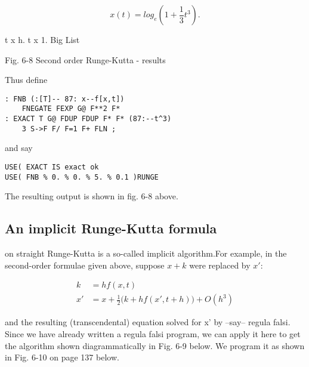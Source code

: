 \begin{equation}
x(t) =log_e(1 +\frac{1}{3}t^3).
    \label{eq:06_22} 
\end{equation}

t x h. t x 1.
Big List

Fig. 6-8 Second order Runge-Kutta - results

Thus define

\begin{lstlisting}
: FNB (:[T]-- 87: x--f[x,t])
    FNEGATE FEXP G@ F**2 F*
: EXACT T G@ FDUP FDUP F* F* (87:--t^3)
    3 S->F F/ F=1 F+ FLN ;
\end{lstlisting}

and say

\begin{lstlisting}
USE( EXACT IS exact ok
USE( FNB % 0. % 0. % 5. % 0.1 )RUNGE
\end{lstlisting}

The resulting output is shown in fig. 6-8 above.

\subsection{An implicit Runge-Kutta formula}
 on straight Runge-Kutta is a so-called implicit algorithm.For example, in the second-order formulae given above, suppose $x + k$ were replaced by $x'$:

\begin{equation}
\begin{aligned}
    k &= hf(x,t)\\
    x' &= x + \frac{1}{2}\big(k + hf(x',t+h)\big) + O(h^3)
    \label{eq:06_23} 
\end{aligned}
\end{equation}

and the resulting (transcendental) equation solved for x' by --say-- regula falsi. Since we have already written a regula falsi program, we can apply it here to get the algorithm shown diagrammatically in Fig. 6-9 below. We program it as shown in Fig. 6-10 on page 137 below.

